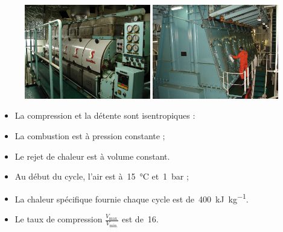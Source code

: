 	\begin{figure}
		\begin{center}
			\includegraphics[width=0.49\textwidth]{images/photo_diesel_generateur.jpg}
			\includegraphics[width=0.49\textwidth]{images/photo_diesel_propulsion.jpg}
		\end{center}
	\end{figure}

	\begin{itemize}
		\item La compression et la détente sont isentropiques :
		\item La combustion est à pression constante ;
		\item Le rejet de chaleur est à volume constant.
		\item Au début du cycle, l’air est à~\SI{15}{\degreeCelsius} et~\SI{1}{\bar} ;
		\item La chaleur spécifique fournie chaque cycle est de~\SI{400}{\kilo\joule\per\kilogram}. 
		\item Le taux de compression $\frac{V_\text{max.}}{V_\text{min.}}$ est de~\num{16}.
	\end{itemize}
	
